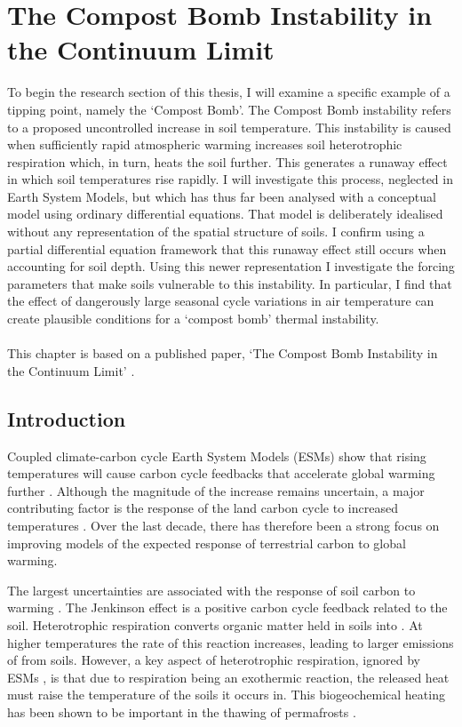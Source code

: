 \chapter{The Compost Bomb Instability in the Continuum Limit}
\label{chapter:continuous_compost_bomb}
\graphicspath{{continuous_compost_bomb/figs/}}

To begin the research section of this thesis, I will examine a specific example of a tipping point, namely the `Compost Bomb'. The
Compost Bomb instability refers to a proposed uncontrolled increase in soil temperature. This instability is caused when sufficiently rapid
atmospheric warming increases soil heterotrophic respiration which, in turn, heats the soil further. This generates a runaway
effect in which soil temperatures rise rapidly. I will investigate this process, neglected in Earth System Models, but which has thus far been analysed with a conceptual
model using ordinary differential equations. That model is deliberately idealised without any representation of the spatial structure of soils.
I confirm using a partial differential equation framework that this runaway effect still occurs when accounting for soil depth.
Using this newer representation I investigate the forcing parameters that make soils vulnerable to this instability. In particular, I find that the effect of
dangerously large seasonal cycle variations in air temperature can create plausible conditions for a `compost bomb' thermal instability.
\\\\
This chapter is based on a published paper, `The Compost Bomb Instability in the Continuum Limit' \parencite{Clarke2021}.

 \section{Introduction}
\label{section:compost_bomb_intro}
Coupled climate-carbon cycle Earth System Models (ESMs) show that rising temperatures will cause carbon cycle feedbacks that accelerate global
warming further \parencite{Cox2000}. Although the magnitude of the increase remains uncertain, a major contributing factor is the
response of the land carbon cycle to increased temperatures \parencite{Friedlingstein2006,Arora2020}. Over the last decade, there has therefore been a strong focus on improving
models of the expected response of terrestrial carbon to global warming.

The largest uncertainties are associated with the response of soil carbon to warming \parencite{Varney2020}.
The Jenkinson effect \parencite{Jenkinson1991} is a positive carbon cycle feedback related to the soil. Heterotrophic respiration converts
organic matter held in soils into . At higher temperatures the rate of this reaction increases, leading to
larger emissions of  from soils. However, a key aspect of heterotrophic respiration, ignored by ESMs \parencite{Arora2020}, is that due to respiration being
an exothermic reaction, the released heat must raise the temperature of the soils it occurs in. This biogeochemical heating has been shown
to be important in the thawing of permafrosts \parencite{Khvorostyanov2008,Khvorostyanov2008a}.

